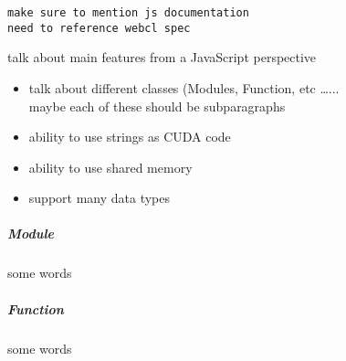 
\begin{verbatim}
make sure to mention js documentation
need to reference webcl spec
\end{verbatim}

talk about main features from a JavaScript perspective
\begin{itemize}
\item talk about different classes (Modules, Function, etc \ldots...\\
maybe each of these should be subparagraphs
\item ability to use strings as CUDA code
\item ability to use shared memory
\item support many data types
\end{itemize}

\subparagraph{Module} some words


\subparagraph{Function} some words
